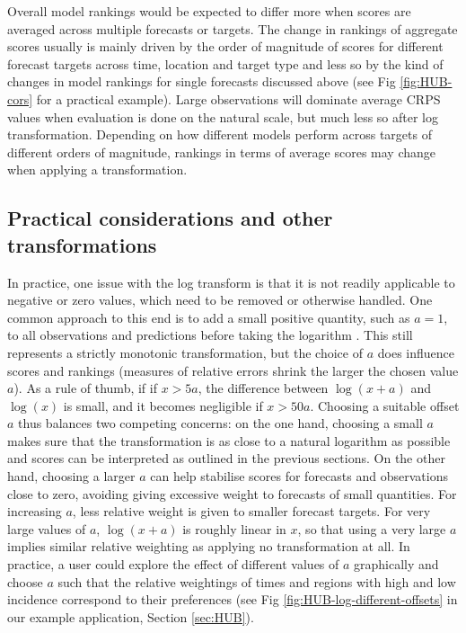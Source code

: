 \documentclass[10pt,letterpaper]{article}
\begin{document}
Overall model rankings would be expected to differ more when scores are averaged across multiple forecasts or targets. The change in rankings of aggregate scores usually is mainly driven by the order of magnitude of scores for different forecast targets across time, location and target type and less so by the kind of changes in model rankings for single forecasts discussed above (see Fig \ref{fig:HUB-cors} for a practical example). Large observations will dominate average CRPS values when evaluation is done on the natural scale, but much less so after log transformation. Depending on how different models perform across targets of different orders of magnitude, rankings in terms of average scores may change when applying a transformation.


\subsection*{Practical considerations and other transformations}
\label{sec:methods:considerations}

In practice, one issue with the log transform is that it is not readily applicable to negative or zero values, which need to be removed or otherwise handled. 
One common approach to this end is to add a small positive quantity, such as $a = 1$, to all observations and predictions before taking the logarithm \cite{bellegoDealingLogsZeros2022}. This still represents a strictly monotonic transformation, but the choice of $a$ does influence scores and rankings (measures of relative errors shrink the larger the chosen value $a$). As a rule of thumb, if if $x > 5a$, the difference between $\log{(x + a)}$ and $\log{(x)}$ is small, and it becomes negligible if $x > 50a$. Choosing a suitable offset $a$ thus balances two competing concerns: on the one hand, choosing a small $a$ makes sure that the transformation is as close to a natural logarithm as possible and scores can be interpreted as outlined in the previous sections. On the other hand, choosing a larger $a$ can help stabilise scores for forecasts and observations close to zero, avoiding giving excessive weight to forecasts of small quantities. For increasing $a$, less relative weight is given to smaller forecast targets. For very large values of $a$, $\log(x + a)$ is roughly linear in $x$, so that using a very large $a$ implies similar relative weighting as applying no transformation at all. In practice, a user could explore the effect of different values of $a$ graphically and choose $a$ such that the relative weightings of times and regions with high and low incidence correspond to their preferences (see Fig \ref{fig:HUB-log-different-offsets} in our example application, Section \ref{sec:HUB}).
\end{document}
